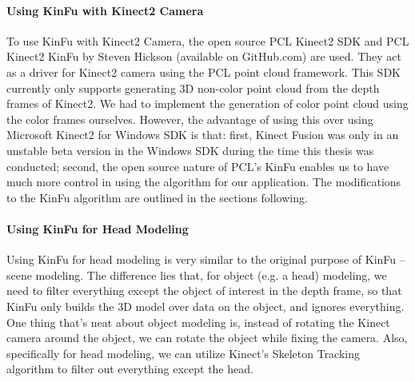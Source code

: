 \documentclass{ut-thesis}
\begin{document}
\paragraph{Using KinFu with Kinect2 Camera}
To use KinFu with Kinect2 Camera, the open source PCL Kinect2 SDK and PCL Kinect2 KinFu by Steven Hickson (available on GitHub.com) are used.  They act as a driver for Kinect2 camera using the PCL point cloud framework.  This SDK currently only supports generating 3D non-color point cloud from the depth frames of Kinect2.  We had to implement the generation of color point cloud using the color frames ourselves.  However, the advantage of using this over using Microsoft Kinect2 for Windows SDK is that: first, Kinect Fusion was only in an unstable beta version in the Windows SDK during the time this thesis was conducted; second, the open source nature of PCL's KinFu enables us to have much more control in using the algorithm for our application.  The modifications to the KinFu algorithm are outlined in the sections following.


\paragraph{Using KinFu for Head Modeling}
Using KinFu for head modeling is very similar to the original purpose of KinFu -- scene modeling.  The difference lies that, for object (e.g. a head) modeling, we need to filter everything except the object of interest in the depth frame, so that KinFu only builds the 3D model over data on the object, and ignores everything.  One thing that's neat about object modeling is, instead of rotating the Kinect camera around the object, we can rotate the object while fixing the camera.  Also, specifically for head modeling, we can utilize Kinect's Skeleton Tracking algorithm to filter out everything except the head.
\end{document}
